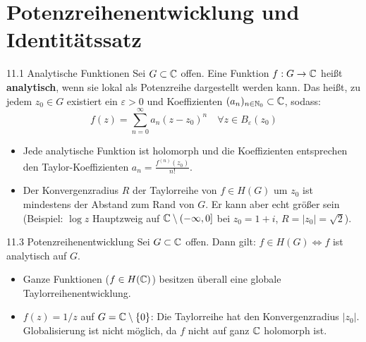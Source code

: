 \section{Potenzreihenentwicklung und Identitätssatz}

\begin{defi}{11.1 Analytische Funktionen}
Sei $G \subset \mathbb{C}$ offen. Eine Funktion $f: G \to \mathbb{C}$ heißt \textbf{analytisch}, wenn sie lokal als Potenzreihe dargestellt werden kann. Das heißt, zu jedem $z_0 \in G$ existiert ein $\varepsilon > 0$ und Koeffizienten $(a_n)_{n\in\mathbb{N}_0} \subset \mathbb{C}$, sodass:
\[
    f(z) = \sum_{n=0}^\infty a_n (z-z_0)^n \quad \forall z \in B_\varepsilon(z_0)
\]
\end{defi}

\begin{tcolorbox}[colback=white, colframe=black!70, title={Bemerkung 11.2 \& 11.4}]
\begin{itemize}
    \item[11.2] Jede analytische Funktion ist holomorph und die Koeffizienten entsprechen den Taylor-Koeffizienten $a_n = \frac{f^{(n)}(z_0)}{n!}$.
    \item[11.4] Der Konvergenzradius $R$ der Taylorreihe von $f \in H(G)$ um $z_0$ ist mindestens der Abstand zum Rand von $G$. Er kann aber echt größer sein (Beispiel: $\log z$ Hauptzweig auf $\mathbb{C} \setminus (-\infty, 0]$ bei $z_0 = 1+i$, $R = |z_0| = \sqrt{2}$).
\end{itemize}
\end{tcolorbox}

\begin{satz}{11.3 Potenzreihenentwicklung}
Sei $G \subset \mathbb{C}$ offen. Dann gilt: $f \in H(G) \iff f$ ist analytisch auf $G$.
\end{satz}

\begin{tcolorbox}[colback=white, colframe=black!70, title={Bsp. 11.5}]
\begin{itemize}
    \item[i)] Ganze Funktionen ($f \in H(\mathbb{C})$) besitzen überall eine globale Taylorreihenentwicklung.
    \item[ii)] $f(z) = 1/z$ auf $G = \mathbb{C} \setminus \{0\}$: Die Taylorreihe hat den Konvergenzradius $|z_0|$. Globalisierung ist nicht möglich, da $f$ nicht auf ganz $\mathbb{C}$ holomorph ist.
\end{itemize}
\end{tcolorbox}

